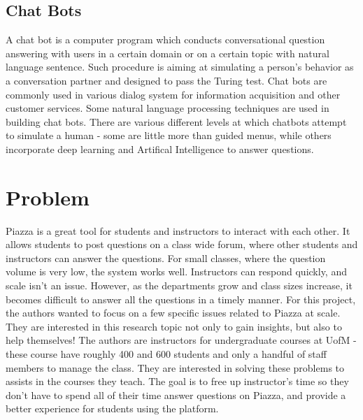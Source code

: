 \documentclass[sigconf]{acmart}
\begin{document}
\subsection{Chat Bots}
A chat bot is a computer program which conducts conversational question answering  with users in a certain domain or on a certain topic with natural language sentence. Such procedure is aiming at simulating a person’s behavior as a conversation partner and designed to pass the Turing test. Chat bots are commonly used in various dialog system for information acquisition and other customer services. Some natural language processing techniques are used in building chat bots. There are various different levels at which chatbots attempt to simulate a human - some are little more than guided menus, while others incorporate deep learning and Artifical Intelligence to answer questions.

\section{Problem}
Piazza is a great tool for students and instructors to interact with each other. It allows students to post questions on a class wide forum, where other students and instructors can answer the questions. For small classes, where the question volume is very low, the system works well. Instructors can respond quickly, and scale isn't an issue. However, as the departments grow and class sizes increase, it becomes difficult to answer all the questions in a timely manner. For this project, the authors wanted to focus on a few specific issues related to Piazza at scale. They are interested in this research topic not only to gain insights, but also to help themselves! The authors are instructors for undergraduate courses at UofM - these course have roughly 400 and 600 students and only a handful of staff members to manage the class. They are interested in solving these problems to assists in the courses they teach. The goal is to free up instructor's time so they don't have to spend all of their time answer questions on Piazza, and provide a better experience for students using the platform.
\end{document}
